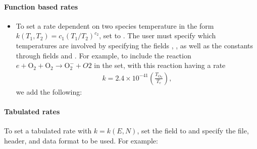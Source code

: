 \documentclass[letterpaper,10pt,english]{sphinxmanual}
\begin{document}
\paragraph{Function based rates}
\label{\detokenize{Applications/CdrPlasmaModel:function-based-rates}}\begin{itemize}
\item {} 
\sphinxAtStartPar
To set a rate dependent on two species temperature in the form \(k(T_1, T_2) = c_1\left(T_1/T_2\right)^{c_2}\), set  to .
The user must specify which temperatures are involved by specifying the fields , , as well as the constants through fields  and .
For example, to include the reaction \(e + \textrm{O}_2 + \textrm{O}_2 \rightarrow \textrm{O}_2^- + O2\) in the set, with this reaction having a rate
\begin{equation*}
\begin{split}k = 2.4\times 10^{-41}\left(\frac{T_{\textrm{O}_2}}{T_e}\right),\end{split}
\end{equation*}
\sphinxAtStartPar
we add the following:

\begin{sphinxVerbatim}[commandchars=\\\{\},formatcom=\scriptsize]
  \PYG{p}{[}
       
       
       
       
       
       
  \PYG{p}{]}
\end{sphinxVerbatim}

\end{itemize}


\paragraph{Tabulated rates}
\label{\detokenize{Applications/CdrPlasmaModel:tabulated-rates}}
\sphinxAtStartPar
To set a tabulated rate with \(k = k(E,N)\), set the field  to  and specify the file, header, and data format to be used.
For example:
\end{document}
